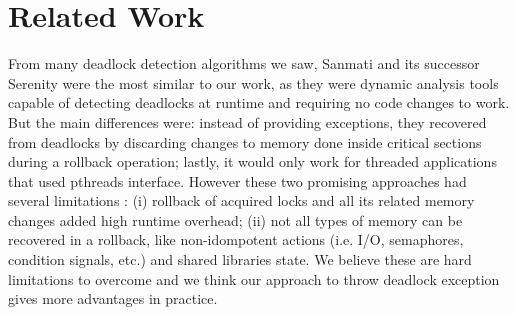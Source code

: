 \section{Related Work}

From many deadlock detection algorithms we saw, Sanmati \cite{sammati} and its successor Serenity \cite{serenity} were the most similar to our work,
as they were dynamic analysis tools capable of detecting deadlocks at runtime and requiring no code changes to work.
But the main differences were: instead of providing exceptions, they recovered from deadlocks by discarding changes to memory done
inside critical sections during a rollback operation; lastly, it would only work for threaded applications that used pthreads interface.
However these two promising approaches had several limitations \cite{pyla}:
(i) rollback of acquired locks and all its related memory changes added high runtime overhead;
(ii) not all types of memory can be recovered in a rollback, like non-idompotent actions (i.e. I/O, semaphores, condition signals, etc.) and shared libraries state.
We believe these are hard limitations to overcome and we think our approach to throw deadlock exception gives more advantages in practice.